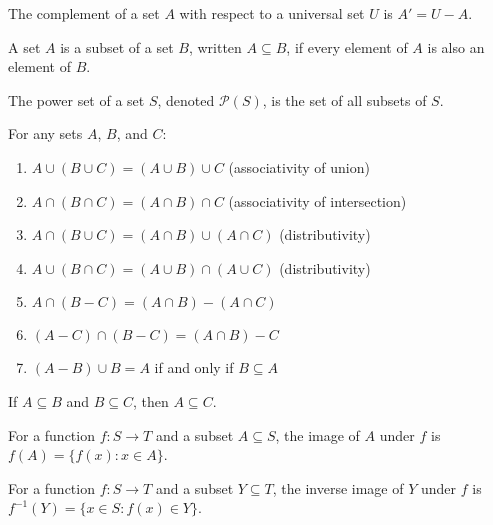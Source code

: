 \begin{definition}[Complement]
The complement of a set $A$ with respect to a universal set $U$ is $A' = U - A$.
\end{definition}

\begin{definition}[Subset]
A set $A$ is a subset of a set $B$, written $A \subseteq B$, if every element of $A$ is also an element of $B$.
\end{definition}

\begin{definition}
The power set of a set $S$, denoted $\mathcal{P}(S)$, is the set of all subsets of $S$.
\end{definition}

\begin{theorem}
For any sets $A$, $B$, and $C$:
\begin{enumerate}
\item $A \cup (B \cup C) = (A \cup B) \cup C$ (associativity of union)
\item $A \cap (B \cap C) = (A \cap B) \cap C$ (associativity of intersection)
\item $A \cap (B \cup C) = (A \cap B) \cup (A \cap C)$ (distributivity)
\item $A \cup (B \cap C) = (A \cup B) \cap (A \cup C)$ (distributivity)
\item $A \cap (B - C) = (A \cap B) - (A \cap C)$
\item $(A - C) \cap (B - C) = (A \cap B) - C$
\item $(A - B) \cup B = A$ if and only if $B \subseteq A$
\end{enumerate}
\end{theorem}

\begin{theorem}
If $A \subseteq B$ and $B \subseteq C$, then $A \subseteq C$.
\end{theorem}

\begin{definition}[Image]
For a function $f: S \to T$ and a subset $A \subseteq S$, the image of $A$ under $f$ is $f(A) = \{f(x) : x \in A\}$.
\end{definition}

\begin{definition}
For a function $f: S \to T$ and a subset $Y \subseteq T$, the inverse image of $Y$ under $f$ is $f^{-1}(Y) = \{x \in S : f(x) \in Y\}$.
\end{definition}


